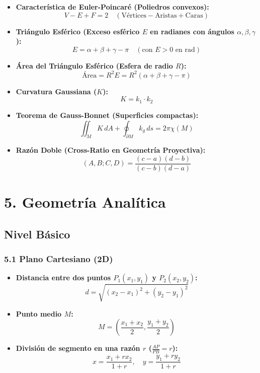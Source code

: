 \documentclass[11pt,a4paper]{article}
\begin{document}
\begin{itemize}
  \item \textbf{Característica de Euler-Poincaré (Poliedros convexos):}
  \[
    V - E + F = 2 \quad (\text{Vértices} - \text{Aristas} + \text{Caras})
  \]
  \item \textbf{Triángulo Esférico (Exceso esférico $E$ en radianes con ángulos $\alpha, \beta, \gamma$):}
  \[
    E = \alpha + \beta + \gamma - \pi \quad (\text{con } E > 0 \text{ en rad})
  \]
  \item \textbf{Área del Triángulo Esférico (Esfera de radio $R$):}
  \[
    \text{Área} = R^2 E = R^2 (\alpha + \beta + \gamma - \pi)
  \]
  \item \textbf{Curvatura Gaussiana ($K$):}
  \[
    K = k_1 \cdot k_2
  \]
  \item \textbf{Teorema de Gauss-Bonnet (Superficies compactas):}
  \[
    \iint_M K \, dA + \oint_{\partial M} k_g \, ds = 2\pi \chi(M)
  \]
  \item \textbf{Razón Doble (Cross-Ratio en Geometría Proyectiva):}
  \[
    (A, B; C, D) = \frac{(c - a)(d - b)}{(c - b)(d - a)}
  \]
\end{itemize}

\section*{5. Geometría Analítica}

\subsection*{Nivel Básico}

\subsubsection*{5.1 Plano Cartesiano (2D)}

\begin{itemize}
  \item \textbf{Distancia entre dos puntos $P_1(x_1, y_1)$ y $P_2(x_2, y_2)$:}
  \[
    d = \sqrt{(x_2 - x_1)^2 + (y_2 - y_1)^2}
  \]
  \item \textbf{Punto medio $M$:}
  \[
    M = \left(\frac{x_1 + x_2}{2}, \frac{y_1 + y_2}{2}\right)
  \]
  \item \textbf{División de segmento en una razón $r$ ($\frac{AP}{PB} = r$):}
  \[
    x = \frac{x_1 + r x_2}{1 + r}, \quad y = \frac{y_1 + r y_2}{1 + r}
  \]
\end{itemize}
\end{document}
